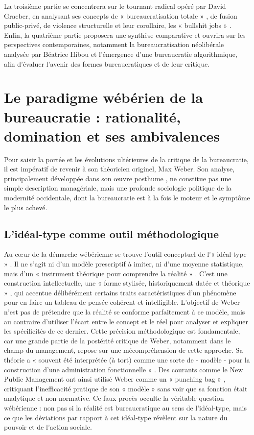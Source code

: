 La troisième partie se concentrera sur le tournant radical opéré par David Graeber, en analysant ses concepts de « bureaucratisation totale » , de fusion public-privé, de violence structurelle et leur corollaire, les « bullshit jobs » . Enfin, la quatrième partie proposera une synthèse comparative et ouvrira sur les perspectives contemporaines, notamment la bureaucratisation néolibérale analysée par Béatrice Hibou et l'émergence d'une bureaucratie algorithmique, afin d'évaluer l'avenir des formes bureaucratiques et de leur critique.

\chapter{Le paradigme wébérien de la bureaucratie : rationalité, domination et ses ambivalences}

Pour saisir la portée et les évolutions ultérieures de la critique de la bureaucratie, il est impératif de revenir à son théoricien originel, Max Weber. Son analyse, principalement développée dans son œuvre posthume \citep{Weber1927Wirtschaft}, ne constitue pas une simple description managériale, mais une profonde sociologie politique de la modernité occidentale, dont la bureaucratie est à la fois le moteur et le symptôme le plus achevé.

\section{L'idéal-type comme outil méthodologique}
Au cœur de la démarche wébérienne se trouve l'outil conceptuel de l'« idéal-type » . Il ne s'agit ni d'un modèle prescriptif à imiter, ni d'une moyenne statistique, mais d'un « instrument théorique pour comprendre la réalité » . C'est une construction intellectuelle, une « forme stylisée, historiquement datée et théorique » , qui accentue délibérément certains traits caractéristiques d'un phénomène pour en faire un tableau de pensée cohérent et intelligible. L'objectif de Weber n'est pas de prétendre que la réalité se conforme parfaitement à ce modèle, mais au contraire d'utiliser l'écart entre le concept et le réel pour analyser et expliquer les spécificités de ce dernier.
Cette précision méthodologique est fondamentale, car une grande partie de la postérité critique de Weber, notamment dans le champ du management, repose sur une mécompréhension de cette approche. Sa théorie a « souvent été interprétée (à tort) comme une sorte de - modèle - pour la construction d'une administration fonctionnelle » . Des courants comme le New Public Management ont ainsi utilisé Weber comme un « punching bag » , critiquant l'inefficacité pratique de son « modèle »  sans voir que sa fonction était analytique et non normative. Ce faux procès occulte la véritable question wébérienne : non pas si la réalité est bureaucratique au sens de l'idéal-type, mais ce que les déviations par rapport à cet idéal-type révèlent sur la nature du pouvoir et de l'action sociale.


